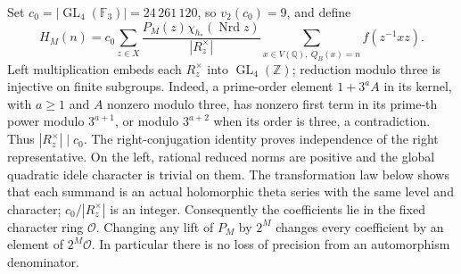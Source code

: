Set $c_0=|\operatorname{GL}_4(\mathbb F_3)|=24\,261\,120$,
so $v_2(c_0)=9$, and define
\[
 H_M(n)=c_0\sum_{z\in X}
 \frac{P_M(z)\chi_{h_*}(\operatorname{Nrd}z)}{|R_z^\times|}
       \sum_{x\in V(\mathbb Q),\ Q_B(x)=n}f(z^{-1}xz). \tag{O.4}
\]
Left multiplication embeds each $R_z^\times$ into
$\operatorname{GL}_4(\mathbb Z)$; reduction modulo three is
injective on finite subgroups.  Indeed, a prime-order element
$1+3^aA$ in its kernel, with $a\geq1$ and $A$ nonzero modulo three,
has nonzero first term in its prime-th power modulo $3^{a+1}$,
or modulo $3^{a+2}$ when its order is three, a contradiction.
Thus $|R_z^\times|\mid c_0$.
The right-conjugation identity proves independence of the right
representative.  On the left, rational reduced norms are positive
and the global quadratic idele character is trivial on them.
The transformation law below shows that each summand is an actual
holomorphic theta series with the same level and character;
$c_0/|R_z^\times|$ is an integer.
Consequently the coefficients lie in the fixed character ring
$\mathcal O$.  Changing any lift of $P_M$ by $2^M$ changes every
coefficient by an element of $2^M\mathcal O$.  In particular
there is no loss of precision from an automorphism denominator.

